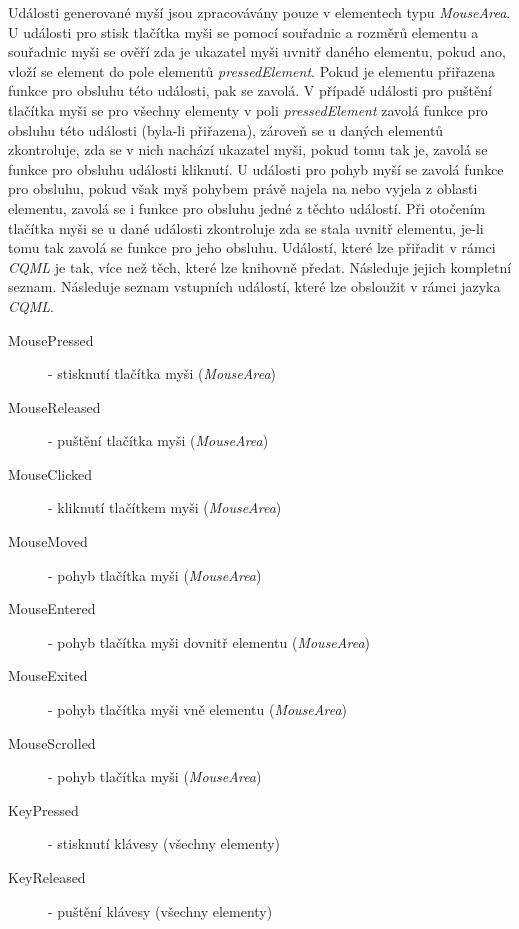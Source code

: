 \documentclass[11pt,twoside,a4paper]{book}
\begin{document}
{{\begin{ttemize}
{{\begin{lastlisting}[frame=single,caption=Řešení v pseudokódu problematického použití operátoru "." v přiřazovacím výroku,label=lst:var0N]
Události generované myší jsou zpracovávány pouze v elementech typu \textit{MouseArea}. U události pro stisk tlačítka myši se pomocí souřadnic a rozměrů elementu a souřadnic myši se ověří zda je ukazatel myši uvnitř daného elementu, pokud ano, vloží se element do pole elementů \textit{pressedElement}. Pokud je elementu přiřazena funkce pro obsluhu této události, pak se zavolá. V případě události pro puštění tlačítka myši se pro všechny elementy v poli \textit{pressedElement} zavolá funkce pro obsluhu této události (byla-li přiřazena), zároveň se u daných elementů zkontroluje, zda se v nich nachází ukazatel myši, pokud tomu tak je, zavolá se funkce pro obsluhu události kliknutí.
U události pro pohyb myší se zavolá funkce pro obsluhu, pokud však myš pohybem právě najela na nebo vyjela z oblasti elementu, zavolá se i funkce pro obsluhu jedné z těchto událostí. Při otočením tlačítka myši se u dané události zkontroluje zda se stala uvnitř elementu, je-li tomu tak zavolá se funkce pro jeho obsluhu.
Událostí, které lze přiřadit v rámci \textit{CQML} je tak, více než těch, které lze knihovně předat. Následuje jejich kompletní seznam.
Následuje seznam vstupních událostí, které lze obsloužit v rámci jazyka \textit{CQML}.
\begin{description}
\item[MousePressed] - stisknutí tlačítka myši (\textit{MouseArea})
\item[MouseReleased] - puštění tlačítka myši (\textit{MouseArea})
\item[MouseClicked] - kliknutí tlačítkem myši (\textit{MouseArea})
\item[MouseMoved] - pohyb tlačítka myši (\textit{MouseArea})
\item[MouseEntered] - pohyb tlačítka myši dovnitř elementu (\textit{MouseArea})
\item[MouseExited] - pohyb tlačítka myši vně elementu (\textit{MouseArea})
\item[MouseScrolled] - pohyb tlačítka myši (\textit{MouseArea})
\item[KeyPressed] - stisknutí klávesy (všechny elementy)
\item[KeyReleased] - puštění klávesy (všechny elementy)
\end{description}




\end{lastlisting}}}
\end{ttemize}}}
\end{document}
